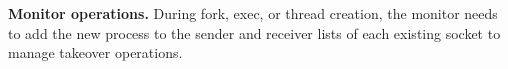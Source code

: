 \textbf {Monitor operations.}
During fork, exec, or thread creation, the monitor needs to add the new process to the sender and receiver lists of each existing socket to manage takeover operations.







